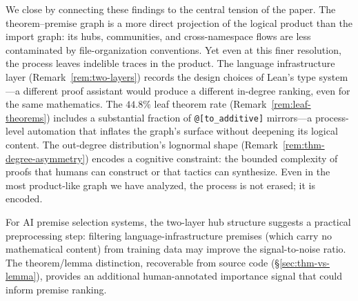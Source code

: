 We close by connecting these findings to the central tension of the paper. The theorem--premise graph is a more direct projection of the logical product than the import graph: its hubs, communities, and cross-namespace flows are less contaminated by file-organization conventions. Yet even at this finer resolution, the process leaves indelible traces in the product. The language infrastructure layer (Remark~\ref{rem:two-layers}) records the design choices of Lean's type system---a different proof assistant would produce a different in-degree ranking, even for the same mathematics. The $44.8\%$ leaf theorem rate (Remark~\ref{rem:leaf-theorems}) includes a substantial fraction of \texttt{@[to\_additive]} mirrors---a process-level automation that inflates the graph's surface without deepening its logical content. The out-degree distribution's lognormal shape (Remark~\ref{rem:thm-degree-asymmetry}) encodes a cognitive constraint: the bounded complexity of proofs that humans can construct or that tactics can synthesize. Even in the most product-like graph we have analyzed, the process is not erased; it is encoded.

For AI premise selection systems, the two-layer hub structure suggests a practical preprocessing step: filtering language-infrastructure premises (which carry no mathematical content) from training data may improve the signal-to-noise ratio. The theorem/lemma distinction, recoverable from source code (\S\ref{sec:thm-vs-lemma}), provides an additional human-annotated importance signal that could inform premise ranking.
